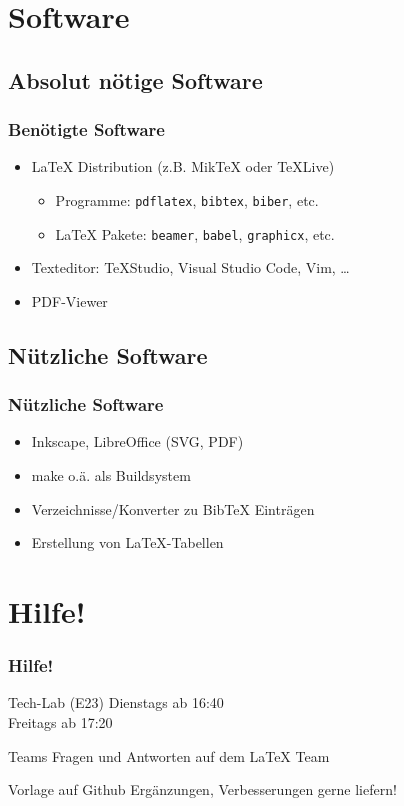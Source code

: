 \documentclass{beamer}
\begin{document}
\section{Software}
\subsection{Absolut nötige Software}
\begin{frame}
	\frametitle{Benötigte Software}
	\begin{itemize}
		\item \LaTeX{} Distribution (z.B. MikTeX oder TeXLive)
			\begin{itemize}
				\item Programme: {\tt pdflatex}, {\tt bibtex}, {\tt biber}, etc.
				\item \LaTeX{} Pakete: {\tt beamer}, {\tt babel}, {\tt graphicx}, etc.
			\end{itemize}
		\item Texteditor: TeXStudio, Visual Studio Code, Vim, \ldots
		\item PDF-Viewer
	\end{itemize}
\end{frame}

\subsection{Nützliche Software}
\begin{frame}
	\frametitle{Nützliche Software}
	\begin{itemize}
		\item Inkscape, LibreOffice (SVG, PDF)
		\item make o.ä. als Buildsystem
		\item Verzeichnisse/Konverter zu Bib\TeX{} Einträgen
		\item Erstellung von \LaTeX{}-Tabellen
	\end{itemize}
\end{frame}



\section{Hilfe!}
\begin{frame}
	\frametitle{Hilfe!}
	\begin{block}{Tech-Lab (E23)}
		Dienstags ab 16:40\\
		Freitags ab 17:20
	\end{block}
	\begin{block}{Teams}
		Fragen und Antworten auf dem \LaTeX{} Team
	\end{block}
	\begin{block}{Vorlage auf Github}
		Ergänzungen, Verbesserungen gerne liefern!
	\end{block}
\end{frame}
\end{document}
